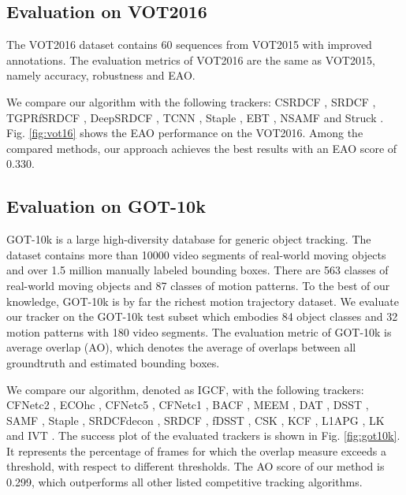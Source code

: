 \subsection{Evaluation on VOT2016}
The VOT2016 \cite{Kristan2016TheVO} dataset contains 60 sequences from VOT2015 with improved annotations. The evaluation metrics of VOT2016 are the same as VOT2015, namely accuracy, robustness and EAO.

We compare our algorithm with the following trackers:
CSRDCF \cite{Lukezic2017DiscriminativeCF}, SRDCF \cite{Danelljan2015LearningSR}, TGPRfSRDCF \cite{gao2018tracking}, DeepSRDCF \cite{Danelljan2015ConvolutionalFF}, TCNN \cite{nam2016modeling}, Staple \cite{Bertinetto2016StapleC}, EBT \cite{Zhu2016BeyondLS}, NSAMF \cite{Hua2015OnlineOT} and Struck \cite{Hare2011StruckSO}. Fig. \ref{fig:vot16} shows the EAO performance on the VOT2016. Among the compared methods, our approach achieves the best results with an EAO score of 0.330.

\subsection{Evaluation on GOT-10k}
GOT-10k \cite{GOT-10k} is a large high-diversity database for generic object tracking. The dataset contains more than 10000 video segments of real-world moving objects and over 1.5 million manually labeled bounding boxes. There are 563 classes of real-world moving objects and 87 classes of motion patterns. 
To the best of our knowledge, GOT-10k is by far the richest motion trajectory dataset.
We evaluate our tracker on the GOT-10k test subset which embodies 84 object classes and 32 motion patterns with 180 video segments.
The evaluation metric of GOT-10k is average overlap (AO), which denotes the average of overlaps between all groundtruth and estimated bounding boxes. 

We compare our algorithm, denoted as IGCF, with the following trackers: CFNetc2 \cite{Valmadre2017EndtoEndRL}, ECOhc \cite{Danelljan2017ECOEC}, CFNetc5 \cite{Valmadre2017EndtoEndRL}, CFNetc1 \cite{Valmadre2017EndtoEndRL}, BACF \cite{Galoogahi2017LearningBC}, MEEM \cite{Zhang2014MEEMRT}, DAT \cite{Possegger2015InDO}, DSST \cite{Danelljan2014AccurateSE}, SAMF \cite{Li2014ASA}, Staple \cite{Bertinetto2016StapleC}, SRDCFdecon \cite{Danelljan2016AdaptiveDO}, SRDCF \cite{Danelljan2015LearningSR}, fDSST \cite{Danelljan2017DiscriminativeSS}, CSK \cite{Henriques2012ExploitingTC}, KCF \cite{henriques2014high-speed}, L1APG \cite{Bao2012RealTR}, LK \cite{Shi1994GoodFT} and IVT \cite{Ross2007IncrementalLF}. The success plot of the evaluated trackers is shown in Fig. \ref{fig:got10k}. It represents the percentage of frames for which the overlap measure exceeds a threshold, with respect to different thresholds. The AO score of our method is 0.299, which outperforms all other listed competitive tracking algorithms.


